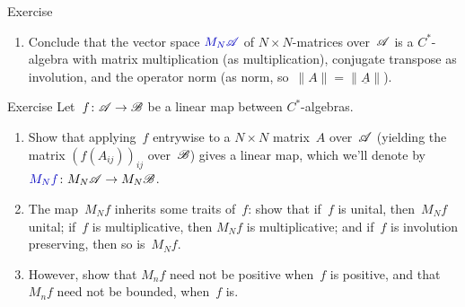 \documentclass[a]{subfiles}
\begin{document}
\begin{parsec}
\begin{point}{Exercise}
\begin{enumerate}
\item
Conclude that the vector space $\Define{M_N\scrA}$
of $N\times N$-matrices over~$\mathscr{A}$
is a $C^*$-algebra
with matrix multiplication (as multiplication),
conjugate transpose as involution,
and the operator norm (as norm, so~$\|A\|=\|\underline{A}\|$).
\end{enumerate}
\end{point}
\begin{point}{Exercise}%
Let~$f\colon \mathscr{A}\to\mathscr{B}$ be a linear map between $C^*$-algebras.
\begin{enumerate}
\item
Show that applying~$f$ entrywise to a $N\times N$ matrix~$A$
over~$\mathscr{A}$ (yielding the matrix $(f(A_{ij}))_{ij}$ over~$\mathscr{B}$)
gives a linear map,
which we'll denote by~$\Define{M_Nf}\colon M_N\scrA\to M_N\scrB$.
\item
The map~$M_Nf$ inherits some traits of~$f$:
show that if~$f$ is unital, then~$M_Nf$ unital;
if~$f$ is multiplicative, then $M_Nf$ is multiplicative; and
if~$f$ is involution preserving, then so is~$M_Nf$.
\item
However,
show that $M_nf$ need not be positive when~$f$ is positive,
and that~$M_nf$ need not be bounded, when~$f$ is.
\end{enumerate}
\end{point}
\end{parsec}
\end{document}
